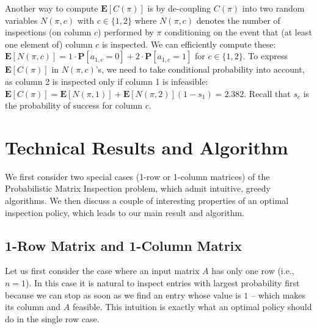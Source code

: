  Another way to compute $\mathbf{E}[C(\pi)]$ is by de-coupling $C(\pi)$ into two random variables $N(\pi, c)$ with $c\in\{1,2\}$ where $N(\pi,c)$ denotes the number of inspections (on column $c$) performed by $\pi$ conditioning on the event that (at least one element of) column $c$ is inspected.
 We can efficiently compute these: $\mathbf{E}[N(\pi, c)] = 1 \cdot \mathbf{P}[a_{1,c} = 0] + 2 \cdot \mathbf{P}[a_{1,c} = 1]$ for $c\in \{1, 2\}$.
 To express $\mathbf{E}[C(\pi)]$ in $N(\pi,c)$'s, we need to take conditional probability into account, as column 2 is inspected only if column 1 is infeasible: 
 $\mathbf{E}[C(\pi)] = \mathbf{E}[N(\pi,1)] + \mathbf{E}[N(\pi,2)] (1-s_1) = 2.382$. Recall that $s_c$ is the probability of success for column $c$.


\section{Technical Results and Algorithm} \label{matrix:sec:results}


 We first consider two special cases (1-row or 1-column matrices) of the Probabilistic Matrix Inspection problem, which admit intuitive, greedy algorithms. We then discuss a couple of interesting properties of an optimal inspection policy, which leads to our main result and algorithm.

 \subsection{1-Row Matrix and 1-Column Matrix}
 Let us first consider the case where an input matrix $A$ has only one row (i.e., $n = 1$).
 In this case it is natural to inspect entries with largest probability first because we can stop as soon as we find an entry whose value is $1$ -- which makes its column and $A$ feasible. This intuition is exactly what an optimal policy should do in the single row case.

